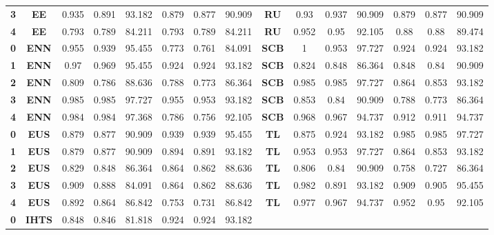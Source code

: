 {{\begin{tabular}{c|c|cccccc|ccccccc}
\textbf{3} & \textbf{EE} & 0.935 & 0.891 & 93.182 & 0.879 & 0.877 & 90.909 & \multicolumn{1}{c|}{\textbf{RU}} & 0.93  & 0.937 & 90.909 & 0.879 & 0.877 & 90.909 \\
\textbf{4} & \textbf{EE} & 0.793 & 0.789 & 84.211 & 0.793 & 0.789 & 84.211 & \multicolumn{1}{c|}{\textbf{RU}} & 0.952 & 0.95  & 92.105 & 0.88  & 0.88  & 89.474 \\
\textbf{0} & \textbf{ENN} & 0.955 & 0.939 & 95.455 & 0.773 & 0.761 & 84.091 & \multicolumn{1}{c|}{\textbf{SCB}} & 1     & 0.953 & 97.727 & 0.924 & 0.924 & 93.182 \\
\textbf{1} & \textbf{ENN} & 0.97  & 0.969 & 95.455 & 0.924 & 0.924 & 93.182 & \multicolumn{1}{c|}{\textbf{SCB}} & 0.824 & 0.848 & 86.364 & 0.848 & 0.84  & 90.909 \\
\textbf{2} & \textbf{ENN} & 0.809 & 0.786 & 88.636 & 0.788 & 0.773 & 86.364 & \multicolumn{1}{c|}{\textbf{SCB}} & 0.985 & 0.985 & 97.727 & 0.864 & 0.853 & 93.182 \\
\textbf{3} & \textbf{ENN} & 0.985 & 0.985 & 97.727 & 0.955 & 0.953 & 93.182 & \multicolumn{1}{c|}{\textbf{SCB}} & 0.853 & 0.84  & 90.909 & 0.788 & 0.773 & 86.364 \\
\textbf{4} & \textbf{ENN} & 0.984 & 0.984 & 97.368 & 0.786 & 0.756 & 92.105 & \multicolumn{1}{c|}{\textbf{SCB}} & 0.968 & 0.967 & 94.737 & 0.912 & 0.911 & 94.737 \\
\textbf{0} & \textbf{EUS} & 0.879 & 0.877 & 90.909 & 0.939 & 0.939 & 95.455 & \multicolumn{1}{c|}{\textbf{TL}} & 0.875 & 0.924 & 93.182 & 0.985 & 0.985 & 97.727 \\
\textbf{1} & \textbf{EUS} & 0.879 & 0.877 & 90.909 & 0.894 & 0.891 & 93.182 & \multicolumn{1}{c|}{\textbf{TL}} & 0.953 & 0.953 & 97.727 & 0.864 & 0.853 & 93.182 \\
\textbf{2} & \textbf{EUS} & 0.829 & 0.848 & 86.364 & 0.864 & 0.862 & 88.636 & \multicolumn{1}{c|}{\textbf{TL}} & 0.806 & 0.84  & 90.909 & 0.758 & 0.727 & 86.364 \\
\textbf{3} & \textbf{EUS} & 0.909 & 0.888 & 84.091 & 0.864 & 0.862 & 88.636 & \multicolumn{1}{c|}{\textbf{TL}} & 0.982 & 0.891 & 93.182 & 0.909 & 0.905 & 95.455 \\
\textbf{4} & \textbf{EUS} & 0.892 & 0.864 & 86.842 & 0.753 & 0.731 & 86.842 & \multicolumn{1}{c|}{\textbf{TL}} & 0.977 & 0.967 & 94.737 & 0.952 & 0.95  & 92.105 \\
\textbf{0} & \textbf{IHTS} & 0.848 & 0.846 & 81.818 & 0.924 & 0.924 & 93.182 &       &       &       &       &       &       &  \\

\end{tabular}}}
